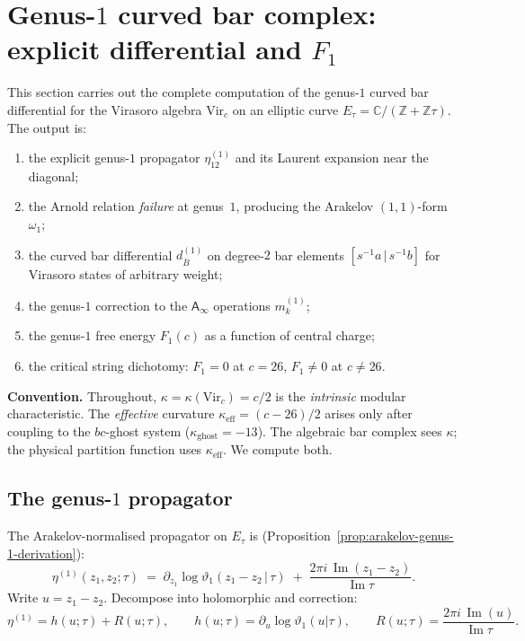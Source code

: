 \documentclass[11pt]{article}
\newcommand{\barB}{\overline{B}}
\newcommand{\C}{\mathbb{C}}
\newcommand{\Z}{\mathbb{Z}}
\newcommand{\Ainf}{\mathsf{A}_{\infty}}
\begin{document}
\section{Genus-$1$ curved bar complex: explicit differential and $F_1$}
\label{sec:genus-1-curved-bar}

This section carries out the complete computation of the genus-$1$
curved bar differential for the Virasoro algebra $\mathrm{Vir}_c$
on an elliptic curve $E_\tau = \C / (\Z + \Z\tau)$.  The
output is:
\begin{enumerate}[label=(\roman*)]
\item the explicit genus-$1$ propagator $\eta^{(1)}_{12}$ and its
  Laurent expansion near the diagonal;
\item the Arnold relation \emph{failure} at genus~$1$, producing
  the Arakelov $(1,1)$-form $\omega_1$;
\item the curved bar differential
  $d^{(1)}_{\barB}$ on degree-$2$ bar elements
  $[s^{-1}a \,|\, s^{-1}b]$ for Virasoro states of arbitrary
  weight;
\item the genus-$1$ correction to the $\Ainf$ operations
  $m_k^{(1)}$;
\item the genus-$1$ free energy $F_1(c)$ as a function of central
  charge;
\item the critical string dichotomy: $F_1 = 0$ at $c = 26$,
  $F_1 \neq 0$ at $c \neq 26$.
\end{enumerate}

\medskip

\noindent
\textbf{Convention.}
Throughout, $\kappa = \kappa(\mathrm{Vir}_c) = c/2$ is the
\emph{intrinsic} modular characteristic.  The \emph{effective}
curvature $\kappa_{\mathrm{eff}} = (c-26)/2$ arises only
after coupling to the $bc$-ghost system ($\kappa_{\mathrm{ghost}} = -13$).
The algebraic bar complex sees $\kappa$; the physical partition
function uses $\kappa_{\mathrm{eff}}$.  We compute both.

\subsection{The genus-$1$ propagator}
\label{subsec:wn-genus1-propagator}

The Arakelov-normalised propagator on $E_\tau$ is
(Proposition~\ref{prop:arakelov-genus-1-derivation}):
\begin{equation}\label{eq:wn-eta-1}
\eta^{(1)}(z_1, z_2;\tau)
\;=\;
\partial_{z_1}\log\vartheta_1(z_1 - z_2 \,|\, \tau)
\;+\;
\frac{2\pi i \,\operatorname{Im}(z_1 - z_2)}
     {\operatorname{Im}\tau}.
\end{equation}
Write $u = z_1 - z_2$.  Decompose into holomorphic and
correction:
\[
\eta^{(1)} = h(u;\tau) + R(u;\tau),
\qquad
h(u;\tau) = \partial_u\log\vartheta_1(u|\tau),
\qquad
R(u;\tau) = \frac{2\pi i\,\operatorname{Im}(u)}
{\operatorname{Im}\tau}.
\]
\end{document}
